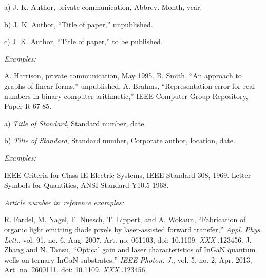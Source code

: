 \documentclass[journal,twoside,web]{ieeecolor}
\begin{document}

\noindent a) J. K. Author, private communication, Abbrev. Month, year.

\noindent b) J. K. Author, ``Title of paper,'' unpublished.

\noindent c) J. K. Author, ``Title of paper,'' to be published.

{\it Examples:}{\vadjust{\vspace*{-2.5em}}}

\begin{thebibliography}{00}
 A. Harrison, private communication, May 1995.
 B. Smith, ``An approach to graphs of linear forms,'' unpublished.
 A. Brahms, ``Representation error for real numbers in binary computer arithmetic,'' IEEE Computer Group Repository, Paper R-67-85.
\end{thebibliography}


\noindent a) {\it Title of Standard}, Standard number, date.

\noindent b) {\it Title of Standard}, Standard number, Corporate author, location, date.

{\it Examples:}{\vadjust{\vspace*{-2.5em}}}

\begin{thebibliography}{00}
 IEEE Criteria for Class IE Electric Systems, IEEE Standard 308, 1969.
 Letter Symbols for Quantities, ANSI Standard Y10.5-1968.
\end{thebibliography}

{\it Article number in~reference examples:}{\vadjust{\vspace*{-2.5em}}}

\begin{thebibliography}{00}
 R. Fardel, M. Nagel, F. Nuesch, T. Lippert, and A. Wokaun, ``Fabrication of organic light emitting diode pixels by laser-assisted forward transfer,'' {\it Appl. Phys. Lett.}, vol. 91, no. 6, Aug. 2007, Art. no. 061103, doi:  {10.1109.} {{\it XXX}} {.123456}.
 J. Zhang and N. Tansu, ``Optical gain and laser characteristics of InGaN quantum wells on ternary InGaN substrates,'' {\it IEEE Photon. J.}, vol. 5, no. 2, Apr. 2013, Art. no. 2600111, doi:  {10.1109.} {{\it XXX}} {.123456}.
\end{thebibliography}
\end{document}
